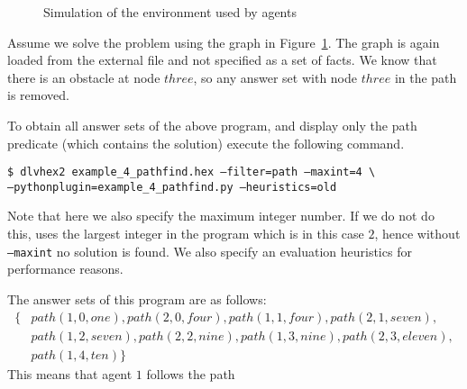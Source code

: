 \documentclass[a4paper, titlepage]{article}
\newcommand\leftaligned[1]{\par \smallskip \noindent \qquad #1 \smallskip \par}
\begin{document}
\begin{figure}
\begin{center}
\end{center}
\caption{Simulation of the environment used by agents}
\label{fig:pathfinding}
\end{figure}

Assume we solve the problem using the graph in Figure~\ref{fig:pathfinding}.
The graph is again loaded from the external file and not 
specified as a set of facts.
We know that there is an obstacle at node $\mathit{three}$, so any answer set with node 
$\mathit{three}$ in the path is removed.

To obtain all answer sets of the above program,
and display only the path predicate (which contains the solution)
execute the following command.

\leftaligned{\texttt{\$ dlvhex2 example\_4\_pathfind.hex --filter=path --maxint=4 \textbackslash \\
\hphantom{\quad \$ dlvhex2 }--pythonplugin=example\_4\_pathfind.py --heuristics=old}}

\noindent
Note that here we also specify the maximum integer number.
If we do not do this, \dlvhex{} uses the largest integer in the program
which is in this case $2$, hence without {\tt --maxint} no solution is found.
We also specify an evaluation heuristics for performance reasons.

The answer sets of this program are as follows:
\begin{align*}
 \{ & path(1,0,one),path(2,0,four),path(1,1,four),path(2,1,seven), \\
 & path(1,2,seven),path(2,2,nine),path(1,3,nine),path(2,3,eleven), \\
 & path(1,4,ten) \}
\end{align*} 
This means that agent $1$ follows the path
\smallskip
\end{document}
